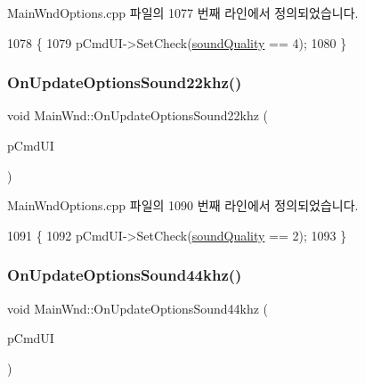 Main\+Wnd\+Options.\+cpp 파일의 1077 번째 라인에서 정의되었습니다.


\begin{DoxyCode}
1078 \{
1079   pCmdUI->SetCheck(\mbox{\hyperlink{gb_sound_8cpp_aaeaa156dcc7083863fa6554b8e14854a}{soundQuality}} == 4);
1080 \}
\end{DoxyCode}
\mbox{\label{class_main_wnd_a46fd5386680b36338e706b9ca4e54694}} 
\subsubsection{\texorpdfstring{On\+Update\+Options\+Sound22khz()}{OnUpdateOptionsSound22khz()}}
{\footnotesize\ttfamily void Main\+Wnd\+::\+On\+Update\+Options\+Sound22khz (\begin{DoxyParamCaption}\item[{C\+Cmd\+UI $\ast$}]{p\+Cmd\+UI }\end{DoxyParamCaption})\hspace{0.3cm}{\ttfamily [protected]}}



Main\+Wnd\+Options.\+cpp 파일의 1090 번째 라인에서 정의되었습니다.


\begin{DoxyCode}
1091 \{
1092   pCmdUI->SetCheck(\mbox{\hyperlink{gb_sound_8cpp_aaeaa156dcc7083863fa6554b8e14854a}{soundQuality}} == 2);
1093 \}
\end{DoxyCode}
\mbox{\label{class_main_wnd_addaa6cd2dcb4b919176fb2214e6def42}} 
\subsubsection{\texorpdfstring{On\+Update\+Options\+Sound44khz()}{OnUpdateOptionsSound44khz()}}
{\footnotesize\ttfamily void Main\+Wnd\+::\+On\+Update\+Options\+Sound44khz (\begin{DoxyParamCaption}\item[{C\+Cmd\+UI $\ast$}]{p\+Cmd\+UI }\end{DoxyParamCaption})\hspace{0.3cm}{\ttfamily [protected]}}



